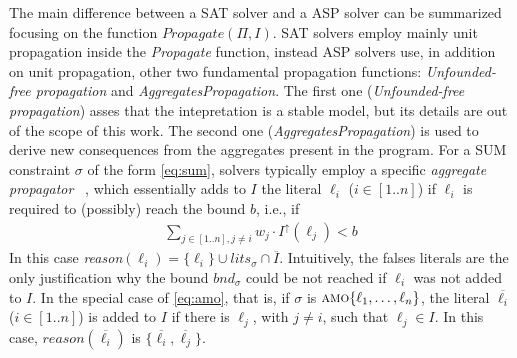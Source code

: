 The main difference between a SAT solver and a ASP solver can be summarized focusing on 
the function $\mathit{Propagate}(\Pi,I)$.
SAT solvers employ mainly unit propagation inside the \textit{Propagate} function,
instead ASP solvers use, in addition on unit propagation, other two fundamental  
propagation functions: \textit{Unfounded-free propagation} and \textit{AggregatesPropagation}.
The first one (\textit{Unfounded-free propagation}) asses that the intepretation is a stable model, but its details
are out of the scope of this work.
The second one (\textit{AggregatesPropagation}) is used to derive new consequences from 
the aggregates present in the program. 
For a SUM constraint $\sigma$ of the form \eqref{eq:sum},
solvers typically employ a 
specific \textit{aggregate propagator}
~\cite{DBLP:conf/iclp/GebserKKS09,DBLP:journals/fuin/FaberLMR11},
which essentially adds to $I$ the literal $\ell_i$ ($i \in [1..n]$) if $\ell_i$ is required to (possibly) reach the bound $b$, i.e., if
\begin{align}\label{eq:sum:propagation}
    \sum_{j \in [1..n], j \neq i}{w_j \cdot I^\uparrow(\ell_j)} < b
\end{align}
In this case \textit{reason}$(\ell_i) = \{\ell_i\} \cup lits_{\sigma} \cap \overline{I}$.
Intuitively, the falses literals are the only justification why the bound $\mathit{bnd}_{\sigma}$
could be not reached if $\ell_i$ was not added to $I$.
In the special case of \eqref{eq:amo}, that is, if $\sigma$ is $\textsc{amo}\{\ell_1, \ldots, \ell_n\}$, the literal $\overline{\ell_i}$ ($i \in [1..n]$) is added to $I$ if there is $\ell_j$, with $j \neq i$, such that $\ell_j \in I$.
In this case, $\mathit{reason}(\overline{\ell_i})$ is $\{\overline{\ell_i}, \overline{\ell_j}\}$.

